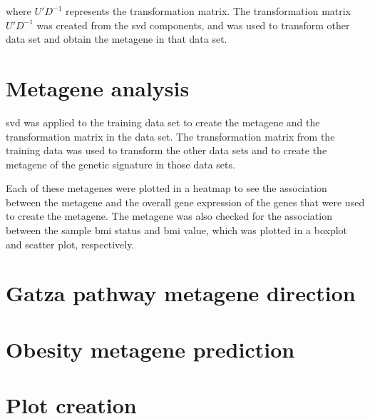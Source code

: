 \noindent
where $U'D^{-1}$ represents the transformation matrix.
The transformation matrix $U'D^{-1}$ was created from the \gls{svd} components, and was used to transform other data set and obtain the metagene in that data set.

\section{Metagene analysis}
\label{sec:metagene_analysis}

\gls{svd} was applied to the training data set to create the metagene and the transformation matrix in the data set.
The transformation matrix from the training data was used to transform the other data sets and to create the metagene of the genetic signature in those data sets.

Each of these metagenes were plotted in a heatmap to see the association between the metagene and the overall gene expression of the genes that were used to create the metagene.
The metagene was also checked for the association between the sample \gls{bmi} status and \gls{bmi} value, which was plotted in a boxplot and scatter plot, respectively.

\section{Gatza pathway metagene direction}
\label{sec:pathway_metagene_direction}














\section{Obesity metagene prediction}
\label{sec:obesity_metagene_prediction}
















\section{Plot creation}
\label{sec:plot_creation}














